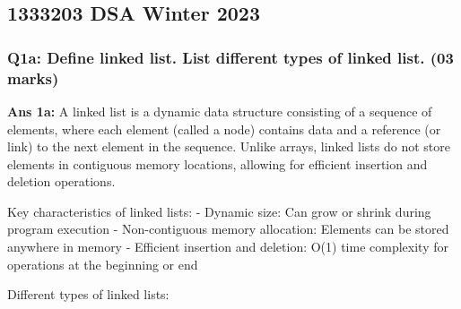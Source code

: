 \documentclass{article}
\begin{document}
\subsection{1333203 DSA Winter 2023}\label{dsa-winter-2023}

\subsubsection{Q1a: Define linked list. List different types of linked
list. (03
marks)}\label{q1a-define-linked-list.-list-different-types-of-linked-list.-03-marks}

\textbf{Ans 1a:} A linked list is a dynamic data structure consisting of
a sequence of elements, where each element (called a node) contains data
and a reference (or link) to the next element in the sequence. Unlike
arrays, linked lists do not store elements in contiguous memory
locations, allowing for efficient insertion and deletion operations.

Key characteristics of linked lists: - Dynamic size: Can grow or shrink
during program execution - Non-contiguous memory allocation: Elements
can be stored anywhere in memory - Efficient insertion and deletion:
O(1) time complexity for operations at the beginning or end

Different types of linked lists:
\end{document}
